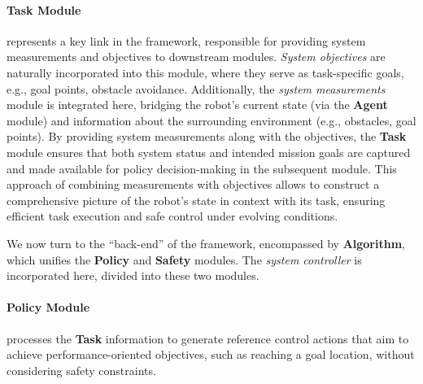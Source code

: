 \paragraph{\textbf{Task Module}} represents a key link in the \spark framework, responsible for providing system measurements and objectives to downstream modules. 
\textit{System objectives} are naturally incorporated into this module, where they serve as task-specific goals, e.g., goal points, obstacle avoidance. 
Additionally, the \textit{system measurements} module is integrated here, bridging the robot’s current state (via the \textbf{Agent} module) and information about the surrounding environment (e.g., obstacles, goal points). 
By providing system measurements along with the objectives, the \textbf{Task} module ensures that both system status and intended mission goals are captured and made available for policy decision-making in the subsequent module. 
This approach of combining measurements with objectives allows \spark to construct a comprehensive picture of the robot’s state in context with its task, ensuring efficient task execution and safe control under evolving conditions. 

We now turn to the ``back-end'' of the framework, encompassed by \textbf{Algorithm}, which unifies the \textbf{Policy} and \textbf{Safety} modules. The \textit{system controller} is incorporated here, divided into these two modules.


\paragraph{\textbf{Policy Module}} processes the \textbf{Task} information to generate reference control actions that aim to achieve performance-oriented objectives, such as reaching a goal location, without considering safety constraints. 

